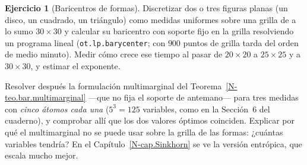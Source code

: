 \documentclass[11pt,a4paper]{amsart}
\newcounter{chapter}
\theoremstyle{remark}
\theoremstyle{definition}
\newtheorem{ejercicio}{Ejercicio}[chapter]
\numberwithin{subsection}{section}
\numberwithin{equation}{section}
\begin{document}
\begin{ejercicio}[Baricentros de formas]\label{ejc.bar.formas}
Discretizar dos o tres figuras planas (un disco, un cuadrado, un triángulo)
como medidas uniformes sobre una grilla de a lo sumo $30\times30$ y calcular
su baricentro con soporte fijo en la grilla resolviendo un programa lineal
(\texttt{ot.lp.barycenter}; con $900$ puntos de grilla tarda del orden de
medio minuto). Medir cómo crece ese tiempo al pasar de $20\times20$ a
$25\times25$ y a $30\times30$, y estimar el exponente.

Resolver después la formulación multimarginal del
Teorema~\ref{N-teo.bar.multimarginal} —que no fija el soporte de antemano— para
tres medidas con \emph{cinco átomos cada una} ($5^3=125$ variables, como en la
Sección~6 del cuaderno), y comprobar allí que los dos valores óptimos
coinciden. Explicar por qué el multimarginal no se puede usar sobre la grilla
de las formas: ¿cuántas variables tendría? En el
Capítulo~\ref{N-cap.Sinkhorn} se ve la versión entrópica, que escala mucho
mejor.
\end{ejercicio}
\end{document}
